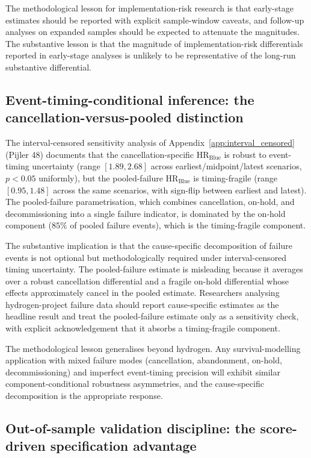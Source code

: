 The methodological lesson for implementation-risk research is that early-stage estimates should be reported with explicit sample-window caveats, and follow-up analyses on expanded samples should be expected to attenuate the magnitudes. The substantive lesson is that the magnitude of implementation-risk differentials reported in early-stage analyses is unlikely to be representative of the long-run substantive differential.

\subsection{Event-timing-conditional inference: the cancellation-versus-pooled distinction}
\label{sec:ch10-event-timing}

The interval-censored sensitivity analysis of Appendix~\ref{app:interval_censored} (Pijler 48) documents that the cancellation-specific HR$_{\text{Blue}}$ is robust to event-timing uncertainty (range $[1.89, 2.68]$ across earliest/midpoint/latest scenarios, $p < 0.05$ uniformly), but the pooled-failure HR$_{\text{Blue}}$ is timing-fragile (range $[0.95, 1.48]$ across the same scenarios, with sign-flip between earliest and latest). The pooled-failure parametrisation, which combines cancellation, on-hold, and decommissioning into a single failure indicator, is dominated by the on-hold component ($85\%$ of pooled failure events), which is the timing-fragile component.

The substantive implication is that the cause-specific decomposition of failure events is not optional but methodologically required under interval-censored timing uncertainty. The pooled-failure estimate is misleading because it averages over a robust cancellation differential and a fragile on-hold differential whose effects approximately cancel in the pooled estimate. Researchers analysing hydrogen-project failure data should report cause-specific estimates as the headline result and treat the pooled-failure estimate only as a sensitivity check, with explicit acknowledgement that it absorbs a timing-fragile component.

The methodological lesson generalises beyond hydrogen. Any survival-modelling application with mixed failure modes (cancellation, abandonment, on-hold, decommissioning) and imperfect event-timing precision will exhibit similar component-conditional robustness asymmetries, and the cause-specific decomposition is the appropriate response.

\subsection{Out-of-sample validation discipline: the score-driven specification advantage}
\label{sec:ch10-oos-validation}

